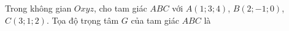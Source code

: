 \begin{ex}
Trong không gian $Oxyz$, cho tam giác $ABC$ với $A(1;3;4)$, $B(2;-1;0)$, $C(3;1;2)$. Tọa độ trọng tâm $G$ của tam giác $ABC$ là
\end{ex}
